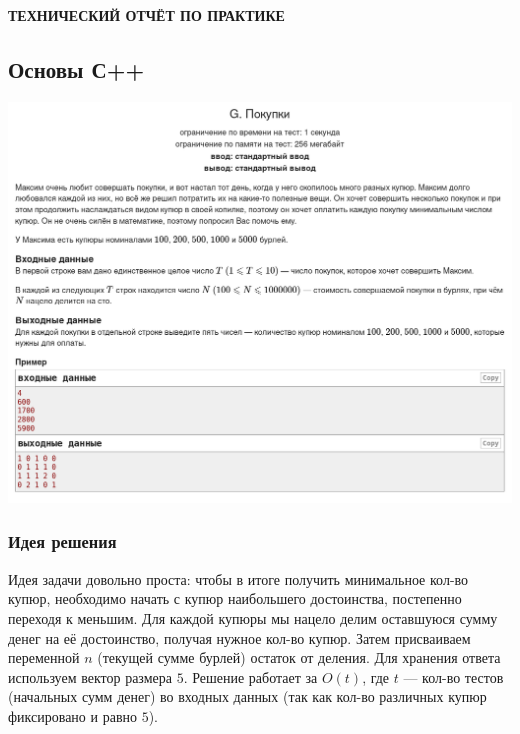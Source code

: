 %
%

\begin{center}
\bfseries{\large ТЕХНИЧЕСКИЙ ОТЧЁТ ПО ПРАКТИКЕ}
\end{center}

\subsection*{Основы С++}
\begin{center}
\includegraphics[width=\textwidth]{statements/20220630/G.png}
\end{center}
\subsubsection*{Идея решения}

Идея задачи довольно проста: чтобы в итоге получить минимальное кол-во купюр, необходимо начать с купюр наибольшего достоинства, постепенно переходя к меньшим. Для каждой купюры мы нацело делим оставшуюся сумму денег на её достоинство, получая нужное кол-во купюр. Затем присваиваем переменной $n$ (текущей сумме бурлей) остаток от деления. Для хранения ответа используем вектор размера $5$. Решение работает за $O(t)$, где $t$ --- кол-во тестов (начальных сумм денег) во входных данных (так как кол-во различных купюр фиксировано и равно $5$).

